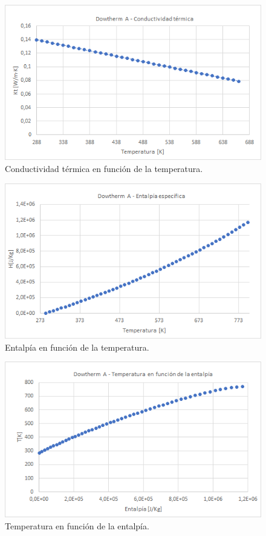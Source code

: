 \documentclass[11pt]{article}
\begin{document}
\begin{figure}
\includegraphics[scale=0.8]{images/curva_conductividad_termica.png}
\caption{Conductividad térmica en función de la temperatura.} 
\label{fig:curvaconductividad}
\end{figure}

\begin{figure}
\includegraphics[scale=0.8]{images/curva_entalpia.png}
\caption{Entalpía en función de la temperatura.} 
\label{fig:curvaentalpia}
\end{figure}

\begin{figure}
\includegraphics[scale=0.8]{images/curva_temperatura_entalpia.png}
\caption{Temperatura en función de la entalpía.} 
\label{fig:curvatemperatura}
\end{figure}
\end{document}
